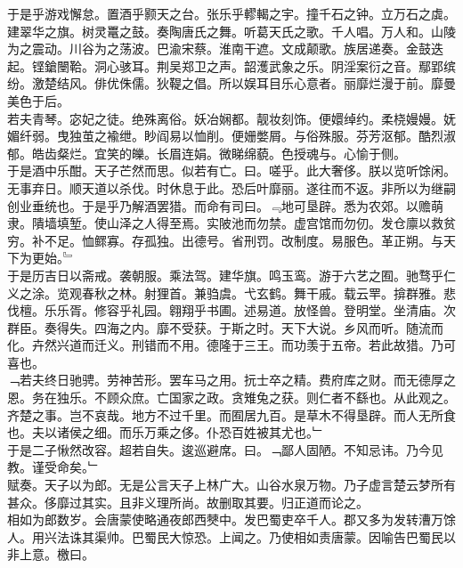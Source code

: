 \documentclass{zhvt-classic}
\begin{document}
\hspace*{2em}于是乎游戏懈怠。置酒乎颢天之台。张乐乎轇輵之宇。撞千石之钟。立万石之虡。建翠华之旗。树灵鼍之鼓。奏陶唐氏之舞。听葛天氏之歌。千人唱。万人和。山陵为之震动。川谷为之荡波。巴渝宋蔡。淮南干遮。文成颠歌。族居递奏。金鼓迭起。铿鎗闛鞈。洞心骇耳。荆吴郑卫之声。韶濩武象之乐。阴淫案衍之音。鄢郢缤纷。激楚结风。俳优侏儒。狄鞮之倡。所以娱耳目乐心意者。丽靡烂漫于前。靡曼美色于后。\\
\hspace*{2em}若夫青琴。宓妃之徒。绝殊离俗。妖冶娴都。靓妆刻饰。便嬛绰约。柔桡嫚嫚。妩媚纤弱。曳独茧之褕绁。眇阎易以恤削。便姗嫳屑。与俗殊服。芬芳沤郁。酷烈淑郁。皓齿粲烂。宜笑的皪。长眉连娟。微睇绵藐。色授魂与。心愉于侧。\\
\hspace*{2em}于是酒中乐酣。天子芒然而思。似若有亡。曰。嗟乎。此大奢侈。朕以览听馀闲。无事弃日。顺天道以杀伐。时休息于此。恐后叶靡丽。遂往而不返。非所以为继嗣创业垂统也。于是乎乃解酒罢猎。而命有司曰。﹃地可垦辟。悉为农郊。以赡萌隶。隤墙填堑。使山泽之人得至焉。实陂池而勿禁。虚宫馆而勿仞。发仓廪以救贫穷。补不足。恤鳏寡。存孤独。出德号。省刑罚。改制度。易服色。革正朔。与天下为更始。﹄\\
\hspace*{2em}于是历吉日以斋戒。袭朝服。乘法驾。建华旗。鸣玉鸾。游于六艺之囿。驰骛乎仁义之涂。览观春秋之林。射狸首。兼驺虞。弋玄鹤。舞干戚。载云䍐。揜群雅。悲伐檀。乐乐胥。修容乎礼园。翱翔乎书圃。述易道。放怪兽。登明堂。坐清庙。次群臣。奏得失。四海之内。靡不受获。于斯之时。天下大说。乡风而听。随流而化。卉然兴道而迁义。刑错而不用。德隆于三王。而功羡于五帝。若此故猎。乃可喜也。\\
\hspace*{2em}﹁若夫终日驰骋。劳神苦形。罢车马之用。抏士卒之精。费府库之财。而无德厚之恩。务在独乐。不顾众庶。亡国家之政。贪雉兔之获。则仁者不繇也。从此观之。齐楚之事。岂不哀哉。地方不过千里。而囿居九百。是草木不得垦辟。而人无所食也。夫以诸侯之细。而乐万乘之侈。仆恐百姓被其尤也。﹂\\
\hspace*{2em}于是二子愀然改容。超若自失。逡巡避席。曰。﹁鄙人固陋。不知忌讳。乃今见教。谨受命矣。﹂\\
\hspace*{2em}赋奏。天子以为郎。无是公言天子上林广大。山谷水泉万物。乃子虚言楚云梦所有甚众。侈靡过其实。且非义理所尚。故删取其要。归正道而论之。\\
\hspace*{2em}相如为郎数岁。会唐蒙使略通夜郎西僰中。发巴蜀吏卒千人。郡又多为发转漕万馀人。用兴法诛其渠帅。巴蜀民大惊恐。上闻之。乃使相如责唐蒙。因喻告巴蜀民以非上意。檄曰。\\
\end{document}
